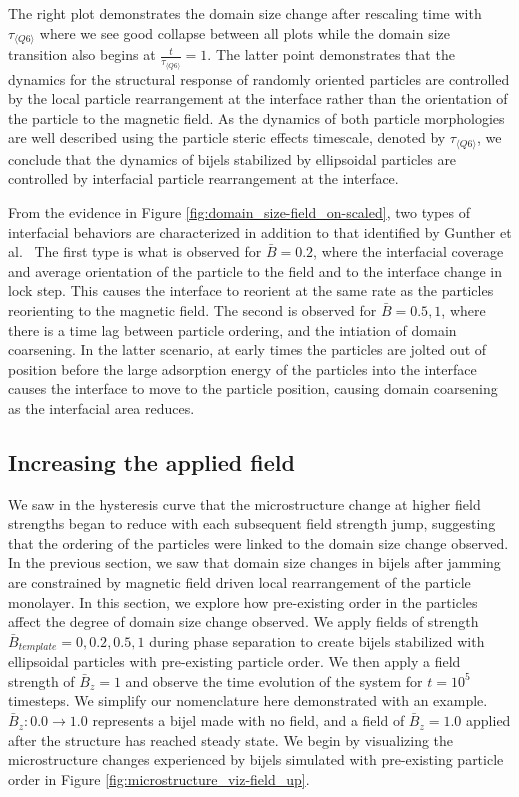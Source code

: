 The right plot demonstrates the domain size change after rescaling time
with $\tau_{\langle Q6 \rangle}$ where we see good collapse between
all plots while the domain size transition also begins at
$\frac{t}{\tau_{\langle Q6 \rangle}} = 1$. The latter point
demonstrates that the dynamics for the structural response of randomly
oriented particles are controlled by the local particle rearrangement at
the interface rather than the orientation of the particle to the
magnetic field. As the dynamics of both particle morphologies are well described
using the particle steric effects timescale, denoted by $\tau_{\langle Q6 \rangle}$,
we conclude that the dynamics of bijels stabilized by ellipsoidal particles are controlled by
interfacial particle rearrangement at the interface.

From the evidence in Figure \ref{fig:domain_size-field_on-scaled}, two
types of interfacial behaviors are characterized in addition to that
identified by Gunther et al.~\cite{gunther_timescales_2014} The first
type is what is observed for $\bar{B} = 0.2$, where the interfacial
coverage and average orientation of the particle to the field and to the
interface change in lock step. This causes the interface to reorient at
the same rate as the particles reorienting to the magnetic field. The
second is observed for $\bar{B} = 0.5, 1$, where there is a time lag
between particle ordering, and the intiation of domain coarsening. In
the latter scenario, at early times the particles are jolted out of
position before the large adsorption energy of the particles into the
interface causes the interface to move to the particle position, causing
domain coarsening as the interfacial area reduces.

\subsection{Increasing the applied
field}\label{increasing-the-applied-field}

We saw in the hysteresis curve that the microstructure change at higher
field strengths began to reduce with each subsequent field strength
jump, suggesting that the ordering of the particles were linked to the
domain size change observed. In the previous section, we saw that domain
size changes in bijels after jamming are constrained by magnetic field
driven local rearrangement of the particle monolayer. In this section,
we explore how pre-existing order in the particles affect the degree of
domain size change observed. We apply fields of strength
\(\bar{B}_{template} = 0, 0.2, 0.5, 1\) during phase separation to
create bijels stabilized with ellipsoidal particles with pre-existing
particle order. We then apply a field strength of \(\bar{B}_z = 1\) and
observe the time evolution of the system for \(t = 10^5\) timesteps. We
simplify our nomenclature here demonstrated with an example.
\(\bar{B}_z: 0.0 \rightarrow 1.0\) represents a bijel made with no
field, and a field of \(\bar{B}_z = 1.0\) applied after the structure
has reached steady state. We begin by visualizing the microstructure
changes experienced by bijels simulated with pre-existing particle order
in Figure \ref{fig:microstructure_viz-field_up}.

